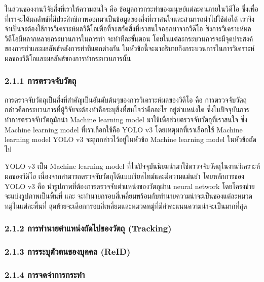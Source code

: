 ในส่วนของงานวิจัยสิ่งที่เราให้ความสนใจ คือ ข้อมูลการกระทำของมนุษย์แต่ละคนภายในวิดีโอ  ซึ่งเพื่อที่เราจะได้ผลลัพธ์ที่มีประสิทธิภาพออกมาเป็นข้อมูลของสิ่งที่เราสนใจและสามารถนำไปใช้ต่อได้ เราจึงจำเป็นจะต้องใช้การวิเคราะห์ผลวิดีโอเพื่อที่จะสกัดสิ่งที่เราสนใจออกมาจากวิด๊โอ ซึ่งการวิเคราะห์ผลวิดีโอมีหลากหลายกระบวนการในการทำ จะทำทีละขั้นตอน โดยในแต่ละกระบวนการจะมีจุดประสงค์ของการทำและผลลัพธ์หลังการทำที่แตกต่างกัน ในหัวข้อนี้จะมาอธิบายถึงกระบวนการในการวิเคราะห์ผลของวิดิโอและผลลัพธ์ของการทำกระบวนการนั้น

\subsubsection*{2.1.1 การตรวจจับวัตถุ}
การตรวจจับวัตถุเป็นสิ่งที่สำคัญเป็นอันดับต้นๆของการวิเคราะห์ผลของวิดีโอ คือ การตรวจจับวัตถุ กล่าวคือกระบวนการที่ผู้วิจัยจะต้องทำคือระบุสิ่งที่สนใจว่าคืออะไร อยู่ตำแหน่งใด ซึ่งในปัจจุบันการทำการตรวจจับวัตถุมักนำ Machine learning model มาใช้เพื่อช่วยตรวจจับวัตถุที่เราสนใจ ซึ่ง Machine learning model ที่เราเลือกใช้คือ YOLO v3 โดยเหตุผลที่เราเลือกใช้ Machine learning model YOLO v3 จะถูกกล่าวไว้อยู่ในหัวข้อ Machine learning model ในหัวข้อถัดไป
\clearpage
\par
YOLO v3 เป็น Machine learning model ที่ในปัจจุบันนิยมนำมาใช้ตรวจจับวัตถุในงานวิเคราะห์ผลของวิดีโอ เนื่องจากสามารถตรวจจับวัตถุได้แบบเรียลไทม์และมีความแม่นยำ โดยหลักการของ YOLO v3 คือ นำรูปภาพที่ต้องการตรวจจับตำแหน่งของวัตถุผ่าน neural network โดยโครงข่ายจะแบ่งรูปภาพเป็นพื้นที่ และ จะทำนายกรอบสี่เหลี่ยมพร้อมกับทำนายความน่าจะเป็นของแต่ละหมวดหมู่ในแต่ละพื้นที่ สุดท้ายจะเลือกกรอบสี่เหลี่ยมและหมวดหมู่ที่มีค่าคะแนนความน่าจะเป็นมากที่สุด

\subsubsection*{2.1.2 การทำนายตำแหน่งถัดไปของวัตถุ (Tracking)}


\subsubsection*{2.1.3 การระบุตัวตนของบุคคล (ReID)}


\subsubsection*{2.1.4 การจดจำการกระทำ}
